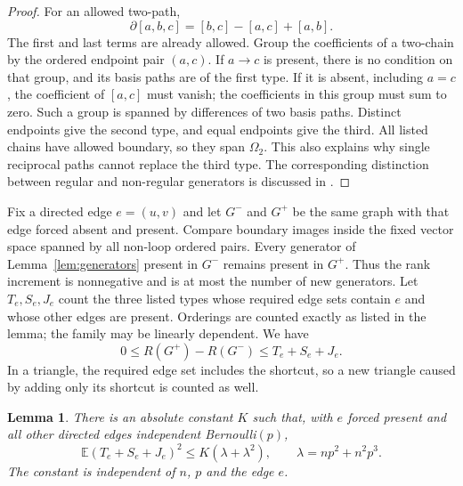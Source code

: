 \documentclass[11pt]{article}
\newtheorem{lemma}{Lemma}
\newcommand{\E}{\mathbb E}
\begin{document}
\begin{proof}
For an allowed two-path,
\begin{equation}\label{eq:two-boundary}
 \partial[a,b,c]=[b,c]-[a,c]+[a,b].
\end{equation}
The first and last terms are already allowed. Group the coefficients of a two-chain by the ordered endpoint pair $(a,c)$. If $a\to c$ is present, there is no condition on that group, and its basis paths are of the first type. If it is absent, including $a=c$, the coefficient of $[a,c]$ must vanish; the coefficients in this group must sum to zero. Such a group is spanned by differences of two basis paths. Distinct endpoints give the second type, and equal endpoints give the third. All listed chains have allowed boundary, so they span $\Omega_2$. This also explains why single reciprocal paths cannot replace the third type. The corresponding distinction between regular and non-regular generators is discussed in \cite[Section 3.3]{chaplin}.
\end{proof}

Fix a directed edge $e=(u,v)$ and let $G^-$ and $G^+$ be the same graph with that edge forced absent and present. Compare boundary images inside the fixed vector space spanned by all non-loop ordered pairs. Every generator of Lemma~\ref{lem:generators} present in $G^-$ remains present in $G^+$. Thus the rank increment is nonnegative and is at most the number of new generators. Let $T_e,S_e,J_e$ count the three listed types whose required edge sets contain $e$ and whose other edges are present. Orderings are counted exactly as listed in the lemma; the family may be linearly dependent. We have
\begin{equation}\label{eq:rank-increment}
 0\le R(G^+)-R(G^-)\le T_e+S_e+J_e.
\end{equation}
In a triangle, the required edge set includes the shortcut, so a new triangle caused by adding only its shortcut is counted as well.

\begin{lemma}\label{lem:rooted}
There is an absolute constant $K$ such that, with $e$ forced present and all other directed edges independent Bernoulli$(p)$,
\begin{equation}\label{eq:rooted}
 \E(T_e+S_e+J_e)^2\le K(\lambda+\lambda^2),
 \qquad \lambda=np^2+n^2p^3.
\end{equation}
The constant is independent of $n$, $p$ and the edge $e$.
\end{lemma}
\end{document}

